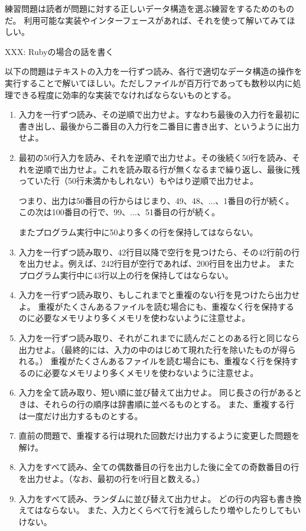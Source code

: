 \begin{exc}
練習問題は読者が問題に対する正しいデータ構造を選ぶ練習をするためのものだ。
利用可能な実装やインターフェースがあれば、それを使って解いてみてほしい。

XXX: Rubyの場合の話を書く

以下の問題はテキストの入力を一行ずつ読み、各行で適切なデータ構造の操作を実行することで解いてほしい。ただしファイルが百万行であっても数秒以内に処理できる程度に効率的な実装でなければならないものとする。

  \begin{enumerate}
    \item 入力を一行ずつ読み、その逆順で出力せよ。すなわち最後の入力行を最初に書き出し、最後から二番目の入力行を二番目に書き出す、というように出力せよ。

    \item  最初の50行入力を読み、それを逆順で出力せよ。その後続く50行を読み、それを逆順で出力せよ。これを読み取る行が無くなるまで繰り返し、最後に残っていた行（50行未満かもしれない）もやはり逆順で出力せよ。

      つまり、出力は50番目の行からはじまり、49、48、...、1番目の行が続く。
	  この次は100番目の行で、99、...、51番目の行が続く。

	 またプログラム実行中に50より多くの行を保持してはならない。

    \item 入力を一行ずつ読み取り、42行目以降で空行を見つけたら、その42行前の行を出力せよ。例えば、242行目が空行であれば、200行目を出力せよ。
	またプログラム実行中に43行以上の行を保持してはならない。

    \item 入力を一行ずつ読み取り、もしこれまでと重複のない行を見つけたら出力せよ。
	重複がたくさんあるファイルを読む場合にも、重複なく行を保持するのに必要なメモリより多くメモリを使わないように注意せよ。

    \item 入力を一行ずつ読み取り、それがこれまでに読んだことのある行と同じなら出力せよ。（最終的には、入力の中のはじめて現れた行を除いたものが得られる。）
	重複がたくさんあるファイルを読む場合にも、重複なく行を保持するのに必要なメモリより多くメモリを使わないように注意せよ。

    \item 入力を全て読み取り、短い順に並び替えて出力せよ。
	同じ長さの行があるときは、それらの行の順序は辞書順に並べるものとする。
	また、重複する行は一度だけ出力するものとする。

    \item 直前の問題で、重複する行は現れた回数だけ出力するように変更した問題を解け。

    \item 入力をすべて読み、全ての偶数番目の行を出力した後に全ての奇数番目の行を出力せよ。（なお、最初の行を0行目と数える。）

    \item 入力をすべて読み、ランダムに並び替えて出力せよ。
	どの行の内容も書き換えてはならない。
	また、入力とくらべて行を減らしたり増やしたりしてもいけない。
  \end{enumerate}
\end{exc}


